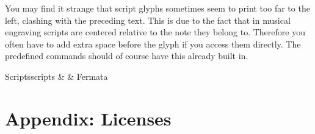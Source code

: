 \documentclass{OLLbook}
\begin{document}
You may find it strange that script glyphs sometimes seem to print too far to the left, clashing with the preceding text.
This is due to the fact that in musical engraving scripts are centered relative to the note they belong to.
Therefore you often have to add extra space before the glyph if you access them directly.
The predefined commands should of course have this already built in.

\begin{reftable}{Scripts}{scripts}
\fermata &  & Fermata\\
\end{reftable}

\pagebreak
\appendix
\small
\chapter{Appendix: Licenses}
\label{chap:licenses}


\end{document}
